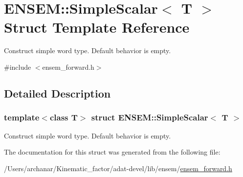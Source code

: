 \hypertarget{structENSEM_1_1SimpleScalar}{}\section{E\+N\+S\+EM\+:\+:Simple\+Scalar$<$ T $>$ Struct Template Reference}
\label{structENSEM_1_1SimpleScalar}


Construct simple word type. Default behavior is empty.  




{\ttfamily \#include $<$ensem\+\_\+forward.\+h$>$}



\subsection{Detailed Description}
\subsubsection*{template$<$class T$>$\newline
struct E\+N\+S\+E\+M\+::\+Simple\+Scalar$<$ T $>$}

Construct simple word type. Default behavior is empty. 

The documentation for this struct was generated from the following file\+:\begin{DoxyCompactItemize}
\item 
/\+Users/archanar/\+Kinematic\+\_\+factor/adat-\/devel/lib/ensem/\mbox{\hyperlink{adat-devel_2lib_2ensem_2ensem__forward_8h}{ensem\+\_\+forward.\+h}}\end{DoxyCompactItemize}
